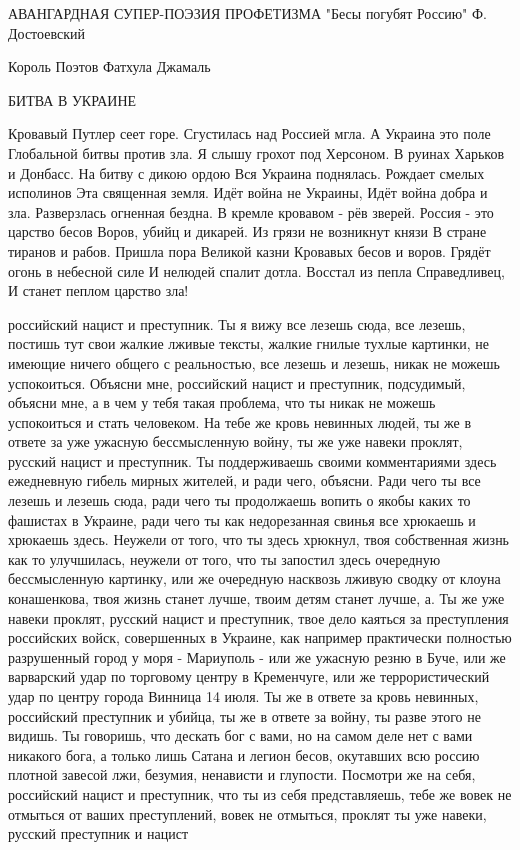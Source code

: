 АВАНГАРДНАЯ СУПЕР-ПОЭЗИЯ ПРОФЕТИЗМА 
"Бесы погубят Россию" 
Ф. Достоевский

Король Поэтов Фатхула Джамаль

БИТВА В УКРАИНЕ 

Кровавый Путлер сеет горе. 
Сгустилась над Россией мгла.
А Украина это поле
Глобальной битвы против зла. 
Я слышу грохот под Херсоном.
В руинах Харьков и Донбасс.
На битву с дикою ордою
Вся Украина поднялась. 
Рождает смелых исполинов 
Эта священная земля.
Идёт война не Украины, 
Идёт война добра и зла.
Разверзлась огненная бездна. 
В кремле кровавом - рёв зверей.
Россия - это царство бесов 
Воров, убийц и дикарей. 
Из грязи не возникнут князи 
В стране тиранов и рабов. 
Пришла пора Великой казни 
Кровавых бесов и воров.
Грядёт огонь в небесной силе
И нелюдей спалит дотла.
Восстал из пепла Справедливец, 
И станет пеплом царство зла! 


российский нацист и преступник. Ты я вижу все лезешь сюда, все лезешь, постишь
тут свои жалкие лживые тексты, жалкие гнилые тухлые картинки, не имеющие ничего
общего с реальностью, все лезешь и лезешь, никак не можешь успокоиться. Объясни
мне, российский нацист и преступник, подсудимый, объясни мне, а в чем у тебя
такая проблема, что ты никак не можешь успокоиться и стать человеком. На тебе
же кровь невинных людей, ты же в ответе за уже ужасную бессмысленную войну, ты
же уже навеки проклят, русский нацист и преступник.  Ты поддерживаешь своими
комментариями здесь ежедневную гибель мирных жителей, и ради чего, объясни.
Ради чего ты все лезешь и лезешь сюда, ради чего ты продолжаешь вопить о якобы
каких то фашистах в Украине, ради чего ты как недорезанная свинья все хрюкаешь
и хрюкаешь здесь. Неужели от того, что ты здесь хрюкнул, твоя собственная жизнь
как то улучшилась, неужели от того, что ты запостил здесь очередную
бессмысленную картинку, или же очередную насквозь лживую сводку от клоуна
конашенкова, твоя жизнь станет лучше, твоим детям станет лучше, а. Ты же уже
навеки проклят, русский нацист и преступник, твое дело каяться за преступления
российских войск, совершенных в Украине, как например практически полностью
разрушенный город у моря - Мариуполь - или же ужасную резню в Буче, или же
варварский удар по торговому центру в Кременчуге, или же террористический удар
по центру города Винница 14 июля. Ты же в
ответе за кровь невинных, российский преступник и убийца, ты же в ответе за
войну, ты разве этого не видишь.  Ты говоришь, что дескать бог с вами, но на
самом деле нет с вами никакого бога, а только лишь Сатана и легион бесов,
окутавших всю россию плотной завесой лжи, безумия, ненависти и глупости.
Посмотри же на себя, российский нацист и преступник, что ты из себя
представляешь, тебе же вовек не отмыться от ваших преступлений, вовек не
отмыться, проклят ты уже навеки, русский преступник и нацист


